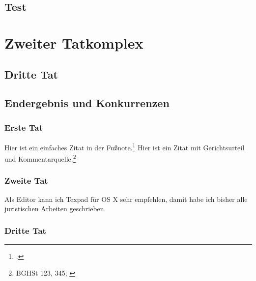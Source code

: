 \chapter{Test}\label{test}\thispagestyle{scrplain}
\renewcommand{\thefootnote}{\fnsymbol{footnote}}\addtocounter{footnote}{1}
\renewcommand{\thefootnote}{\arabic{footnote}}\addtocounter{footnote}{-1}








\part*{Zweiter Tatkomplex}

\chapter{Dritte Tat}
\chapter*{Endergebnis und Konkurrenzen}
\setcounter{section}{0}
\section[Kurzname der im InhaltsVZ angezeigt wird]{Erste Tat}
Hier ist ein einfaches Zitat in der Fußnote.\footcite[S. 14]{a02}
Hier ist ein Zitat mit Gerichtsurteil und Kommentarquelle.\footnote{BGHSt 123, 345; \cite[Autor][§ 123 ]{stgb_lk:331-358}}

\section{Zweite Tat}

Als Editor kann ich Texpad für OS X sehr empfehlen, damit habe ich bisher alle juristischen Arbeiten geschrieben.

\section{Dritte Tat}

